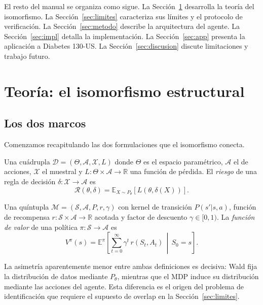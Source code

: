\documentclass[11pt,a4paper]{article}
\theoremstyle{mitheorem}
\theoremstyle{mitdef}
\newcommand{\Risk}{\mathcal{R}}
\newcommand{\Loss}{L}
\newcommand{\Value}{V}
\newcommand{\ParamSpace}{\Theta}
\newcommand{\ActionSpace}{\mathcal{A}}
\newcommand{\SampleSpace}{\mathcal{X}}
\newcommand{\StateSpace}{\mathcal{S}}
\newcommand{\discount}{\gamma}
\newcommand{\decrule}{\delta}
\newcommand{\policy}{\pi}
\newcommand{\E}{\mathbb{E}}
\newcommand{\R}{\mathbb{R}}
\begin{document}
El resto del manual se organiza como sigue. La Sección~\ref{sec:teoria}
desarrolla la teoría del isomorfismo. La Sección~\ref{sec:limites}
caracteriza sus límites y el protocolo de verificación. La
Sección~\ref{sec:metodo} describe la arquitectura del agente. La
Sección~\ref{sec:impl} detalla la implementación. La Sección~\ref{sec:app}
presenta la aplicación a Diabetes 130-US. La Sección~\ref{sec:discusion}
discute limitaciones y trabajo futuro.

\section{Teoría: el isomorfismo estructural}
\label{sec:teoria}

\subsection{Los dos marcos}

Comenzamos recapitulando las dos formulaciones que el isomorfismo conecta.

\begin{tcolorbox}[mitdefstyle, title={Definición 9.1 — Problema de Decisión de Wald}]
Una cuádrupla $\mathcal{D} = (\ParamSpace, \ActionSpace, \SampleSpace, \Loss)$
donde $\ParamSpace$ es el espacio paramétrico, $\ActionSpace$ el de acciones,
$\SampleSpace$ el muestral y $\Loss:\ParamSpace\times\ActionSpace\to\R$ una
función de pérdida. El \emph{riesgo} de una regla de decisión
$\decrule:\SampleSpace\to\ActionSpace$ es
\[
  \Risk(\theta, \decrule) = \E_{X\sim P_\theta}[\Loss(\theta, \decrule(X))].
\]
\end{tcolorbox}

\begin{tcolorbox}[mitdefstyle, title={Definición 9.2 — Proceso de Decisión de Markov}]
Una quíntupla $\mathcal{M} = (\StateSpace, \ActionSpace, P, r, \discount)$ con
kernel de transición $P(s'|s,a)$, función de recompensa $r:\StateSpace\times\ActionSpace\to\R$
acotada y factor de descuento $\discount\in[0,1)$. La \emph{función de valor} de
una política $\policy:\StateSpace\to\ActionSpace$ es
\[
  \Value^\policy(s) = \E^\policy\!\left[\sum_{t=0}^\infty \discount^t\, r(S_t, A_t)\,\middle|\, S_0=s\right].
\]
\end{tcolorbox}

La asimetría aparentemente menor entre ambas definiciones es decisiva:
Wald fija la distribución de datos mediante $P_\theta$, mientras que
el MDP induce su distribución mediante las acciones del agente. Esta
diferencia es el origen del problema de identificación que requiere
el supuesto de overlap en la Sección~\ref{sec:limites}.
\end{document}
